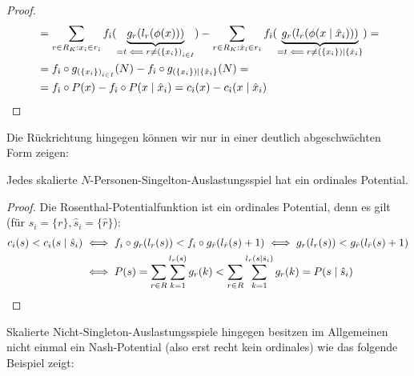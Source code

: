 \begin{proof}
\begin{align*}
	&=\sum_{r \in R_K: x_{\hat{\imath}} \in r_{\hat{\imath}}} f_{\hat{\imath}} (\underbrace{g_r(l_r(\phi(x)))}_{= t \impliedby r \neq \left(\{x_i\}\right)_{i \in I}}) -
	\sum_{r \in R_K: \hat{x}_{\hat{\imath}} \in r_{\hat{\imath}}} f_{\hat{\imath}} (\underbrace{g_r(l_r(\phi(x \mid \hat{x}_i)))}_{= t \impliedby r \neq \left(\{x_i\}\right)\mid\{\hat{x}_i\}}) = \\
	&=f_{\hat{\imath}} \circ g_{\left(\{x_i\}\right)_{i \in I}}(N) - f_{\hat{\imath}} \circ g_{\left(\{x_i\}\right)\mid\{\hat{x}_i\}}(N) = \\
	&=f_{\hat{\imath}} \circ P(x) - f_{\hat{\imath}} \circ P(x \mid \hat{x}_i) = c_{\hat{\imath}}(x) - c_{\hat{\imath}}(x \mid \hat{x}_i)	\qedhere							
	\end{align*}
\end{proof}

Die Rückrichtung hingegen können wir nur in einer deutlich abgeschwächten Form zeigen:

\begin{satz}\label{satz:skalSingeltonAusl}
	Jedes skalierte $N$-Personen-Singelton-Auslastungsspiel hat ein ordinales Potential.
\end{satz}

\begin{proof}
	Die Rosenthal-Potentialfunktion ist ein ordinales Potential, denn es gilt (für $s_i = \{r\}, \hat{s}_i = \{\hat{r}\}$):
	\begin{align*}
	c_i(s) < c_i(s \mid \hat{s}_i) &\iff f_i\circ g_r(l_r(s)) < f_i\circ g_{\hat{r}}(l_{\hat{r}}(s)+1) \iff g_r(l_r(s)) < g_{\hat{r}}(l_{\hat{r}}(s)+1) \\
	&\iff P(s) = \sum_{r \in R}\sum_{k=1}^{l_r(s)} g_r(k) < \sum_{r \in R}\sum_{k=1}^{l_r(s\mid \hat{s}_i)} g_r(k) = P(s\mid \hat{s}_i) \qedhere
	\end{align*}
\end{proof}

Skalierte Nicht-Singleton-Auslastungsspiele hingegen besitzen im Allgemeinen nicht einmal ein Nash-Potential (also erst recht kein ordinales) wie das folgende Beispiel zeigt:

